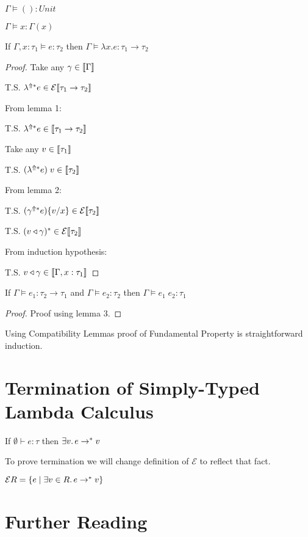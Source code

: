 \begin{lemma}
  $\Gamma \models () : Unit$
\end{lemma}

\begin{lemma}
  $\Gamma \models x : \Gamma(x)$
\end{lemma}

\begin{lemma}
  If $\Gamma, x:\tau_1 \models e : \tau_2$
  then $\Gamma \models \lambda x.e : \tau_1 \to \tau_2$
\end{lemma}
\begin{proof}
  Take any $\gamma \in \llbracket\Gamma\rrbracket$

  T.S. $\lambda^{\Uparrow*} e \in \mathcal{E}\llbracket\tau_1 \to \tau_2\rrbracket$

  From lemma 1:

  T.S. $\lambda^{\Uparrow*} e \in \llbracket\tau_1 \to \tau_2\rrbracket$

  Take any $v \in \llbracket\tau_1\rrbracket$

  T.S. $(\lambda^{\Uparrow*} e)\;v \in \llbracket\tau_2\rrbracket$

  From lemma 2:

  T.S. $(\gamma^{\Uparrow*} e)\{v/x\} \in \mathcal{E}\llbracket\tau_2\rrbracket$

  T.S. $(v \triangleleft \gamma)^* \in \mathcal{E}\llbracket\tau_2\rrbracket$

  From induction hypothesis:

  T.S. $v \triangleleft \gamma \in \llbracket\Gamma, x : \tau_1\rrbracket$
\end{proof}

\begin{lemma}
  If $\Gamma \models e_1 : \tau_2 \to \tau_1 $ and $\Gamma \models e_2 : \tau_2$ then $\Gamma \models e_1\;e_2 : \tau_1$
\end{lemma}
\begin{proof}
  Proof using lemma 3.
\end{proof}

\medskip

Using Compatibility Lemmas proof of Fundamental Property is straightforward induction.

\section{Termination of Simply-Typed Lambda Calculus}

If $\emptyset \vdash e : \tau$ then $\exists v\ldotp e \to^* v$

To prove termination we will change definition of $\mathcal{E}$ to reflect that fact.

$\mathcal{E}R = \{ e \mid \exists v \in R\ldotp e \to^* v \}$

\section{Further Reading}
